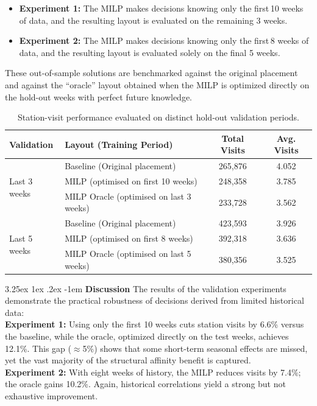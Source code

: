 \documentclass[preprint,review,11pt,authoryear]{elsarticle}
\makeatletter
\renewcommand\paragraph{\@startsection{paragraph}{4}{\z@}
  {3.25ex \@plus1ex \@minus.2ex}
  {-1em}
  {\normalfont\normalsize\itshape}}
\makeatother
\begin{document}
\begin{itemize}
  \item \textbf{Experiment 1:} The MILP makes decisions knowing only the first\,10 weeks of data, and the resulting layout is evaluated on the remaining 3 weeks.  
  \item \textbf{Experiment 2:} The MILP makes decisions knowing only the first\,8 weeks of data, and the resulting layout is evaluated solely on the final 5 weeks.
\end{itemize}

These out-of-sample solutions are benchmarked against the original placement and against the “oracle” layout obtained when the MILP is optimized directly on the hold-out weeks with perfect future knowledge.

\begin{table}[H]
\centering
\small
\renewcommand{\arraystretch}{1.1}
\setlength{\tabcolsep}{6pt}
\begin{tabular}{@{}llcc@{}}
\toprule
\textbf{Validation} & \textbf{Layout (Training Period)} & \textbf{Total Visits} & \textbf{Avg. Visits} \\
\midrule
\multirow{3}{*}{Last 3 weeks} & Baseline (Original placement) & 265,876 & 4.052 \\
& MILP (optimised on first 10 weeks) & 248,358 & 3.785 \\
& MILP Oracle (optimised on last 3 weeks) & 233,728 & 3.562 \\
\midrule
\multirow{3}{*}{Last 5 weeks} & Baseline (Original placement) & 423,593 & 3.926 \\
& MILP (optimised on first 8 weeks) & 392,318 & 3.636 \\
& MILP Oracle (optimised on last 5 weeks) & 380,356 & 3.525 \\
\bottomrule
\end{tabular}
\caption{Station-visit performance evaluated on distinct hold-out validation periods.}
\label{tab:temporal_validation}
\end{table}

\paragraph{\textbf{Discussion}}
The results of the validation experiments demonstrate the practical robustness of decisions derived from limited historical data: \\
\textbf{Experiment 1:} Using only the first 10 weeks cuts station visits by 6.6\% versus the baseline, while the oracle, optimized directly on the test weeks, achieves 12.1\%. This gap ($\approx$5\%) shows that some short-term seasonal effects are missed, yet the vast majority of the structural affinity benefit is captured. \\
\textbf{Experiment 2:} With eight weeks of history, the MILP reduces visits by 7.4\%; the oracle gains 10.2\%. Again, historical correlations yield a strong but not exhaustive improvement. 
\end{document}
